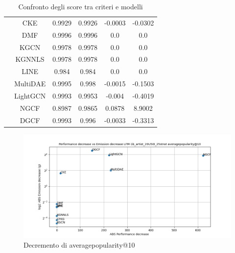 \begin{table}[H]
{\begin{tabular}{|c|c|c|c|c|c|}
                                            & CKE & 0.9929 & 0.9926 & -0.0003 & -0.0302 \\ \cline{2-6}
                                            & DMF & 0.9996 & 0.9996 & 0.0 & 0.0 \\ \cline{2-6}
                                            & KGCN & 0.9978 & 0.9978 & 0.0 & 0.0 \\ \cline{2-6}
                                            & KGNNLS & 0.9978 & 0.9978 & 0.0 & 0.0 \\ \cline{2-6}
                                            & LINE & 0.984 & 0.984 & 0.0 & 0.0 \\ \cline{2-6}
                                            & MultiDAE & 0.9995 & 0.998 & -0.0015 & -0.1503 \\ \cline{2-6}
                                            & LightGCN & 0.9993 & 0.9953 & -0.004 & -0.4019 \\ \cline{2-6}
                                            & NGCF & 0.8987 & 0.9865 & 0.0878 & 8.9002 \\ \cline{2-6}
                                            & DGCF & 0.9993 & 0.996 & -0.0033 & -0.3313 \\ \cline{2-6}
            \hline
        \end{tabular}
    }
    \caption{Confronto degli score tra criteri e modelli}
\end{table}




\begin{figure}[H]
    \centering
     \includegraphics[width=\textwidth]{images/decrement_averagepopularity@10_LFM-1b_artist_20U50I_25strat.png}
    \caption{Decremento di averagepopularity@10}
\end{figure}


